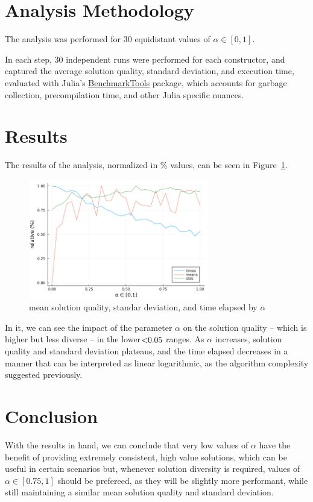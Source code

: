 \documentclass[a4paper,10pt]{article}
\begin{document}
\section{Analysis Methodology}

The analysis was performed for 30 equidistant values of $\alpha \in [0, 1]$.

In each step, 30 independent runs were performed for each constructor, and captured
the average solution quality, standard deviation, and execution time, evaluated with
Julia's \href{https://juliapackages.com/p/benchmarktools}{BenchmarkTools} package,
which accounts for garbage collection, precompilation time, and other Julia specific
nuances.

\section{Results}
The results of the analysis, normalized in \% values, can be seen in Figure~\ref{fig:results}.

\begin{figure}[!ht]
    \centering
    \includegraphics[width=0.7\textwidth]{../simple_constructive_analysis.png}
    \caption{mean solution quality, standar deviation, and time elapsed by $\alpha$}
    \label{fig:results}
\end{figure}

In it, we can see the impact of the parameter $\alpha$ on the solution quality -- which is higher
but less diverse -- in the lower\($<0.05$\) ranges. As $\alpha$ increases, solution quality 
and standard deviation plateaus, and the time elapsed decreases in a manner that can be interpreted
as linear logarithmic, as the algorithm complexity suggested previously. 

\section{Conclusion}

With the results in hand, we can conclude that very low values of $\alpha$ have the benefit of
providing extremely consistent, high value solutions, which can be useful in certain scenarios but,
whenever solution diversity is required, values of $\alpha \in [0.75, 1]$ should be prefereed, as
they will be slightly more performant, while still maintaining a similar mean solution quality and 
standard deviation.
\end{document}
